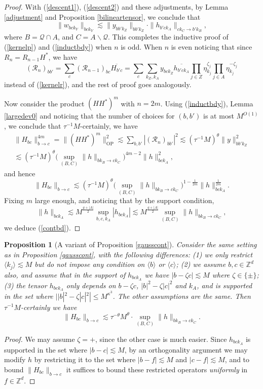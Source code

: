 \documentclass[11 pt,reqno]{amsart}
\newtheorem{prop}[thm]{Proposition}
\theoremstyle{definition}
\theoremstyle{remark}
\numberwithin{equation}{section}
\newcommand{\Qc}{\mathcal{Q}}
\newcommand{\Rc}{\mathcal{R}}
\newcommand{\Zb}{\mathbb{Z}}
\begin{document}
{\begin{proof}
With (\ref{descent1}), (\ref{descent2}) and these adjustments, by Lemma \ref{adjustment} and Proposition \ref{bilineartensor}, we conclude that
 \[\|w_{bck_Y}\|_{bck_Y}\lesssim\|y_{bb'k_Z}\|_{bb'k_Z}\cdot\|h_{b'ck_A}\|_{ck_C\to b'k_B},\] where $B=\Qc\cap A$, and $C=A\backslash \Qc$. This completes the inductive proof of (\ref{kernelp}) and (\ref{inductbdy}) when $n$ is odd. When $n$ is even noticing that since $R_n=R_{n-1}H^*$, we have
   \begin{equation}\label{kernelr2}(\Rc_n)_{bb'}=\sum_{c}(\Rc_{n-1})_{bc}\overline{H_{b'c}}=\sum_{c}\sum_{k_Z,k_A}y_{bck_Z}\overline{h_{b'ck_A}}\prod_{j\in Z}\eta_{k_j}^{\zeta_j}\prod_{j\in A}\eta_{k_j}^{-\zeta_j}\end{equation} instead of (\ref{kernelr}), and the rest of proof goes analogously.
 
Now consider the product $(HH^*)^m$ with $n=2m$. Using (\ref{inductbdy}), Lemma \ref{largedev0} and noticing that the number of choices for $(b,b')$ is at most $M^{O(1)}$, we conclude that $\tau^{-1}M$-certainly, we have
  \begin{multline*}\|H_{bc}\|_{b\to c}^{4m}=\|(HH^*)^m\|_{\mathrm{OP}}^2\lesssim\sum_{b,b'}|(\Rc_n)_{bb'}|^2\lesssim(\tau^{-1}M)^\theta\|y\|_{bb'k_Z}^2\\\lesssim(\tau^{-1}M)^\theta \big(\sup_{(B,C)}\|h\|_{bk_B\to ck_C}\big)^{4m-2}\|h\|_{bck_A}^2,\end{multline*} and hence
  \[\|H_{bc}\|_{b\to c}\lesssim (\tau^{-1}M)^\theta\big(\sup_{(B,C)}\|h\|_{bk_B\to ck_C}\big)^{1-\frac{1}{2m}}\|h\|_{bck_A}^{\frac{1}{2m}}.\] Fixing $m$ large enough, and noticing that by the support condition, 
  \[\|h\|_{bck_A}\lesssim M^{\frac{q+|A|}{2}}\sup_{b,c,k_A}|h_{bck_A}|\lesssim M^{\frac{q+|A|}{2}}\sup_{(B,C)}\|h\|_{bk_B\to ck_C},\]we deduce (\ref{contbd}).
  \end{proof}
\begin{prop}[A variant of Proposition \ref{gausscont}]\label{gausscont2} Consider the same setting as in Proposition \ref{gausscont}, with the following differences: (1) we only restrict $\langle k_j\rangle\lesssim M$ but do not impose any condition on $\langle b\rangle$ or $\langle c\rangle$; (2) we assume $b,c\in\Zb^d$ also, and assume that in the support of $h_{bck_A}$ we have $|b-\zeta c|\lesssim M$ where $\zeta\in\{\pm\}$; (3) the tensor $h_{bck_A}$ only depends on $b-\zeta c$, $|b|^2-\zeta |c|^2$ and $k_A$, and is supported in the set where $||b|^2-\zeta|c|^2|\leq M^{\kappa^3}$. The other assumptions are the same. Then $\tau^{-1}M$-certainly we have
  \begin{equation*}\|H_{bc}\|_{b\to c}\lesssim \tau^{-\theta}M^\theta\cdot\sup_{(B,C)}\|h\|_{bk_B\to ck_C}.
  \end{equation*}
\end{prop}
\begin{proof} We may assume $\zeta=+$, since the other case is much easier. Since $h_{bck_A}$ is supported in the set where $|b-c|\lesssim M$, by an orthogonality argument we may modify $h$ by restricting it to the set where $|b-f|\lesssim M$ and $|c-f|\lesssim M$, and to bound $\|H_{bc}\|_{b\to c}$ it suffices to bound these restricted operators \emph{uniformly} in $f\in\Zb^d$.


\end{proof}}
\end{document}
